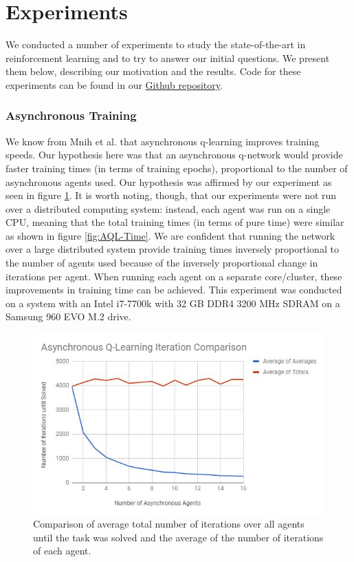 \documentclass[twocolumn]{article}
\begin{document}
	
	\section*{Experiments} 
	We conducted a number of experiments to study the state-of-the-art in 
	reinforcement learning and to try to answer our initial questions. We 
	present them below, describing our motivation and the results. Code for 
	these experiments can be found in our 
	\href{https://github.com/dliangsta/RL-thesis}{Github repository}.\\
	
	\subsubsection*{Asynchronous Training}
	We know from Mnih et al.\cite{Mnih3} that asynchronous q-learning improves 
	training speeds. Our hypothesis here was that an asynchronous q-network 
	would 
	provide faster training times (in terms of training epochs), proportional 
	to the number of asynchronous agents used. Our hypothesis was affirmed by 
	our experiment  as seen in figure \ref{fig:AQL-Iterations}. It is worth 
	noting, though, that our experiments were not run over a distributed 
	computing system: instead, each agent was run on a single CPU, meaning that 
	the total training times (in terms of pure time) were similar 
	as shown in figure \ref{fig:AQL-Time}. We are confident that running the 
	network over a 	large distributed system provide training times inversely 
	proportional to the number of agents used because of the inversely 
	proportional change in iterations per agent. When running each agent on a 
	separate core/cluster, these improvements in training time can be 
	achieved. This experiment was conducted on a system with an Intel i7-7700k 
	with 32 GB DDR4 3200 MHz SDRAM on a Samsung 960 EVO M.2 drive.\\
	\begin{figure}[!htb]
		\centering
		\includegraphics[width=\linewidth]{AQL-Iterations.JPG}
		\caption{Comparison of average total number of iterations over all 
		agents until the task was solved and the average of the number of 
		iterations of each agent.}
		\label{fig:AQL-Iterations}
	\end{figure}\\
\end{document}
